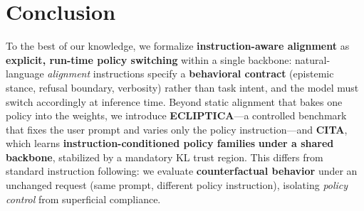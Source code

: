 \documentclass[11pt]{article}
\begin{document}







\section{Conclusion}
\label{sec:conclusion}

To the best of our knowledge, we formalize \textbf{instruction-aware alignment} as \textbf{explicit, run-time policy switching} within a single backbone: natural-language \emph{alignment} instructions specify a \textbf{behavioral contract} (epistemic stance, refusal boundary, verbosity) rather than task intent, and the model must switch accordingly at inference time. Beyond static alignment that bakes one policy into the weights, we introduce \textbf{ECLIPTICA}—a controlled benchmark that fixes the user prompt and varies only the policy instruction—and \textbf{CITA}, which learns \textbf{instruction-conditioned policy families} \textbf{under a shared backbone}, stabilized by a mandatory KL trust region. This differs from standard instruction following: we evaluate \textbf{counterfactual behavior} under an unchanged request (same prompt, different policy instruction), isolating \emph{policy control} from superficial compliance.










\clearpage
\newpage




\clearpage
\newpage



\clearpage
\newpage
\end{document}
